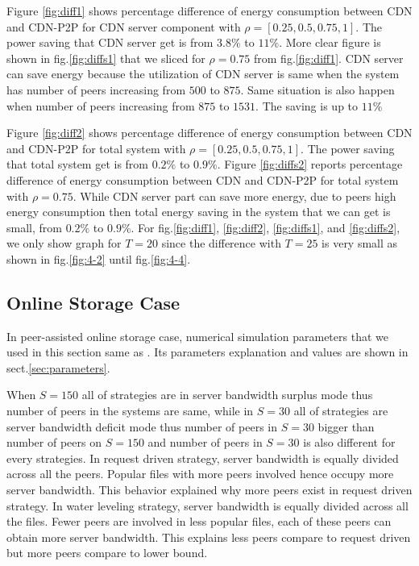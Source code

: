 \documentclass[conference]{IEEEtran}
\begin{document}
Figure \ref{fig:diff1} shows percentage difference of energy consumption between CDN and CDN-P2P for CDN server component with $\rho=[0.25,0.5,0.75,1]$.
The power saving that CDN server get is from $3.8\%$ to $11\%$.
More clear figure is shown in fig.\ref{fig:diffs1} that we sliced for $\rho=0.75$ from fig.\ref{fig:diff1}. 
CDN server can save energy because the utilization of CDN server is same when the system has number of peers increasing from $500$ to $875$.
Same situation is also happen when number of peers increasing from $875$ to $1531$.  
The saving is up to $11\%$ 

Figure \ref{fig:diff2} shows percentage difference of energy consumption between CDN and CDN-P2P for total system with $\rho=[0.25,0.5,0.75,1]$.
The power saving that total system get is from $0.2\%$ to $0.9\%$.
Figure \ref{fig:diffs2} reports percentage difference of energy consumption between CDN and CDN-P2P for total system with $\rho=0.75$.
While CDN server part can save more energy, due to peers high energy consumption then total energy saving in the system that we can get is small, from $0.2\%$ to $0.9\%$.
For fig.\ref{fig:diff1}, \ref{fig:diff2}, \ref{fig:diffs1}, and \ref{fig:diffs2}, we only show graph for $T=20$ since the difference with $T=25$ is very small as shown in fig.\ref{fig:4-2} until fig.\ref{fig:4-4}.


\subsection{Online Storage Case}\label{subsec:onlinestorage}

In peer-assisted online storage case, numerical simulation parameters that we used in this section same as \cite{Sun:2009:POS:1542245.1542249}.
Its parameters explanation and values are shown in sect.\ref{sec:parameters}.

When $S=150$ all of strategies are in server bandwidth surplus mode thus number of peers in the systems are same, while in $S=30$ all of strategies are server bandwidth deficit mode thus number of peers in $S=30$ bigger than number of peers on $S=150$ and number of peers in $S=30$ is also different for every strategies. 
In request driven strategy, server bandwidth is equally divided across all the peers. 
Popular files with more peers involved hence occupy more server bandwidth. 
This behavior explained why more peers exist in request driven strategy.
In water leveling strategy, server bandwidth is equally divided across all the files.  
Fewer peers are involved in less popular files, each of these peers can obtain more server bandwidth.  
This explains less peers compare to request driven but more peers compare to lower bound.
\end{document}
